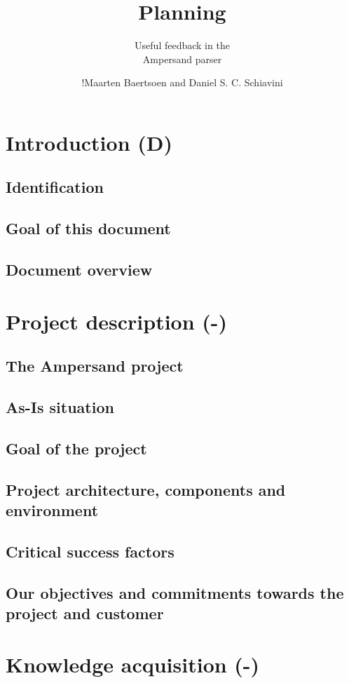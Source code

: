 \documentclass[a4paper,12pt,abstracton,titlepage]{scrartcl}
\author{!Maarten Baertsoen and Daniel S. C. Schiavini}
\affil{Open Universiteit Nederland, faculteit Informatica \\
	T61327 - Afstudeerproject bachelor informatica}
\title{Planning}
\subtitle{Useful feedback in the\\ Ampersand parser}
\begin{document}
\maketitle
\newpage

\tableofcontents
\clearpage

\section{Introduction (D)}
\subsection{Identification}
\subsection{Goal of this document}
\subsection{Document overview}

\section{Project description (-)}
\subsection{The Ampersand project}
\subsection{As-Is situation}
\subsection{Goal of the project}
\subsection{Project architecture, components and environment}
\subsection{Critical success factors}
\subsection{Our objectives and commitments towards the project and customer}

\section{Knowledge acquisition (-)}
\end{document}
